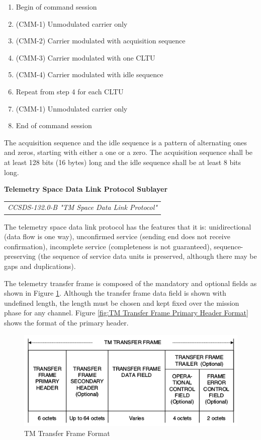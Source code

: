 \begin{enumerate}
\item Begin of command session
\item (CMM-1) Unmodulated carrier only
\item (CMM-2) Carrier modulated with acquisition sequence
\item (CMM-3) Carrier modulated with one CLTU
\item (CMM-4) Carrier modulated with idle sequence 
\item Repeat from step 4 for each CLTU
\item (CMM-1) Unmodulated carrier only
\item End of command session
\end{enumerate}

The acquisition sequence and the idle sequence is a pattern of alternating ones and zeros, starting with either a one or a zero. The acquisition sequence shall be at least 128 bits (16 bytes) long and the idle sequence shall be at least 8 bits long.

\textbf{Telemetry Space Data Link Protocol Sublayer}

\begin{tabular}{l}
\textit{CCSDS-132.0-B "TM Space Data Link Protocol" \cite{CCSDS-132.0-B}} 
\end{tabular}

The telemetry space data link protocol has the features that it is: unidirectional (data flow is one way), unconfirmed service (sending end does not receive confirmation), incomplete service (completeness is not guaranteed), sequence-preserving (the sequence of service data units is preserved, although there may be gaps and duplications).

The telemetry transfer frame is composed of the mandatory and optional fields as shown in Figure \ref{fig:TM Transfer Frame Format}. Although the transfer frame data field is shown with undefined length, the length must be chosen and kept fixed over the mission phase for any channel. Figure \ref{fig:TM Transfer Frame Primary Header Format} shows the format of the primary header.

\begin{figure}[h]
\centering\includegraphics[scale=0.6]{fig/tm_transfer_frame_format}
\caption{TM Transfer Frame Format}
\label{fig:TM Transfer Frame Format}
\end{figure}

